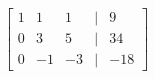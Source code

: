 \documentclass[preview]{standalone}
\begin{document}
\begin{align*}
\begin{bmatrix} 1 & 1 & 1 & | & 9 \\ 0 & 3 & 5 & | & 34 \\ 0 & -1 & -3 & | & -18 \end{bmatrix}
\end{align*}
\end{document}
